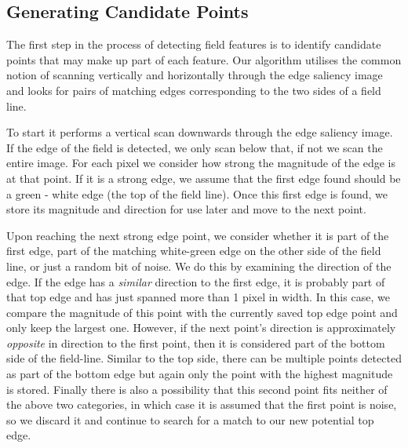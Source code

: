 \documentclass[runningheads,a4paper]{llncs}
\begin{document}

\subsection{Generating Candidate Points}
The first step in the process of detecting field features is to identify candidate points that may make up part of each feature. Our algorithm utilises the common notion of scanning vertically and horizontally through the edge saliency image\cite{chatfield} and looks for pairs of matching edges corresponding to the two sides of a field line.

To start it performs a vertical scan downwards through the edge saliency image. If the edge of the field is detected, we only scan below that, if not we scan the entire image. For each pixel we consider how strong the magnitude of the edge is at that point. If it is a strong edge, we assume that the first edge found should be a green - white edge (the top of the field line). Once this first edge is found, we store its magnitude and direction for use later and move to the next point.

Upon reaching the next strong edge point, we consider whether it is part of the first edge, part of the matching white-green edge on the other side of the field line, or just a random bit of noise. We do this by examining the direction of the edge. If the edge has a \emph{similar} direction to the first edge, it is probably part of that top edge and has just spanned more than 1 pixel in width. In this case, we compare the magnitude of this point with the currently saved top edge point and only keep the largest one. However, if the next point's direction is approximately \emph{opposite} in direction to the first point, then it is considered part of the bottom side of the field-line. Similar to the top side, there can be multiple points detected as part of the bottom edge but again only the point with the highest magnitude is stored. Finally there is also a possibility that this second point fits neither of the above two categories, in which case it is assumed that the first point is noise, so we discard it and continue to search for a match to our new potential top edge.
\end{document}

